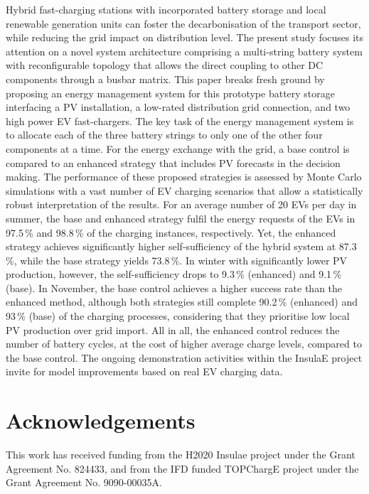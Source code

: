 \documentclass[final,5p,times,twocolumn]{elsarticle}
\begin{document}
Hybrid fast-charging stations with incorporated battery storage and local renewable generation units can foster the decarbonisation of the transport sector, while reducing the grid impact on distribution level. The present study focuses its attention on a novel system architecture comprising a multi-string battery system with reconfigurable topology that allows the direct coupling to other DC components through a busbar matrix. This paper breaks fresh ground by proposing an energy management system for this prototype battery storage interfacing a PV installation, a low-rated distribution grid connection, and two high power EV fast-chargers. The key task of the energy management system is to allocate each of the three battery strings to only one of the other four components at a time. For the energy exchange with the grid, a base control is compared to an enhanced strategy that includes PV forecasts in the decision making. The performance of these proposed strategies is assessed by Monte Carlo simulations with a vast number of EV charging scenarios that allow a statistically robust interpretation of the results. For an average number of 20 EVs per day in summer, the base and enhanced strategy fulfil the energy requests of the EVs in 97.5\,\% and 98.8\,\% of the charging instances, respectively. Yet, the enhanced strategy achieves significantly higher self-sufficiency of the hybrid system at 87.3\,\%, while the base strategy yields 73.8\,\%. In winter with significantly lower PV production, however, the self-sufficiency drops to 9.3\,\% (enhanced) and 9.1\,\% (base). In November,
the base control achieves a higher success rate than the enhanced method, although both strategies still complete 90.2\,\% (enhanced) and 93\,\% (base) of the charging processes, considering that they prioritise low local PV production over grid import. All in all, the enhanced control reduces the number of battery cycles, at the cost of higher average charge levels, compared to the base control. The ongoing demonstration activities within the InsulaE project invite for model improvements based on real EV charging data.


\section*{Acknowledgements}
This work has received funding from the H2020 Insulae project under the Grant Agreement No. 824433, and from the IFD funded TOPChargE project under the Grant Agreement No. 9090-00035A.



\end{document}
